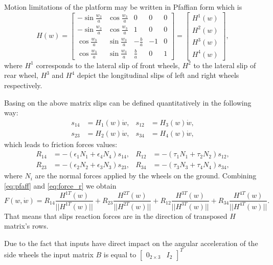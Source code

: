 Motion limitations of the platform may be written in Pfaffian form which is 
\begin{equation}
\label{eq:pfaff}
H(w)=\begin{bmatrix}
-\sin\frac{w_3}{a} & \cos\frac{w_3}{a} & 0 & 0 & 0\\
-\sin\frac{w_3}{a} & \cos\frac{w_3}{a} & 1 & 0 & 0\\
 \cos\frac{w_3}{a} & \sin\frac{w_3}{a} & -\frac{b}{a} & -1 & 0\\
 \cos\frac{w_3}{a} & \sin\frac{w_3}{a} &  \frac{b}{a} &  0 & 1
\end{bmatrix} = \begin{bmatrix}
H^1(w)\\
H^2(w)\\
H^3(w)\\
H^4(w)
\end{bmatrix},
\end{equation}
where $H^1$ corresponds to the lateral slip of front wheels, $H^2$ to the lateral slip of rear wheel, $H^3$ and $H^4$ depict the longitudinal slips of left and right wheels respectively.

Basing on the above matrix slips can be defined quantitatively in the following way: 
\begin{align}
s_{14} &= H_1(w)\dot w, & s_{12} &= H_3(w)\dot w,\\
s_{23} &= H_2(w)\dot w, & s_{34} &= H_4(w)\dot w,
\end{align}
which leads to friction forces values:
\begin{align}
\label{eq:force_r}
R_{14}&=-(\epsilon_1 N_1 + \epsilon_4 N_4)s_{14}, & R_{12}&=-(\tau_1 N_1 + \tau_2 N_2)s_{12},\\
R_{23}&=-(\epsilon_2 N_2 + \epsilon_3 N_3)s_{23}, & R_{34}&=-(\tau_3 N_3 + \tau_4 N_4)s_{34},
\end{align}
where $N_i$ are the normal forces applied by the wheels on the ground.
Combining \eqref{eq:pfaff} and \eqref{eq:force_r} we obtain
\begin{equation}
F(w, \dot{w}) = R_{14}\frac{H^{1T}(w)}{||H^{1T}(w)||} + R_{23}\frac{H^{2T}(w)}{||H^{2T}(w)||} + R_{12}\frac{H^{3T}(w)}{||H^{3T}(w)||} + R_{34}\frac{H^{4T}(w)}{||H^{4T}(w)||}.
\end{equation}
That means that slips reaction forces are in the direction of transposed $H$ matrix's rows.

Due to the fact that inputs have direct impact on the angular acceleration of the side wheels the input matrix $B$ is equal to $\begin{bmatrix}
0_{2 \times 3} & I_2
\end{bmatrix}^T$ 

